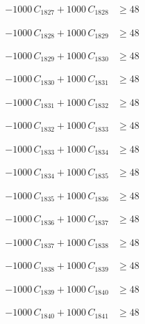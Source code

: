 \documentclass[a4paper,11pt]{article}
\begin{document}
\begin{align}
-1000\,C_{1827} + 1000\,C_{1828} &\geq 48 \nonumber
\end{align}

\begin{align}
-1000\,C_{1828} + 1000\,C_{1829} &\geq 48 \nonumber
\end{align}

\begin{align}
-1000\,C_{1829} + 1000\,C_{1830} &\geq 48 \nonumber
\end{align}

\begin{align}
-1000\,C_{1830} + 1000\,C_{1831} &\geq 48 \nonumber
\end{align}

\begin{align}
-1000\,C_{1831} + 1000\,C_{1832} &\geq 48 \nonumber
\end{align}

\begin{align}
-1000\,C_{1832} + 1000\,C_{1833} &\geq 48 \nonumber
\end{align}

\begin{align}
-1000\,C_{1833} + 1000\,C_{1834} &\geq 48 \nonumber
\end{align}

\begin{align}
-1000\,C_{1834} + 1000\,C_{1835} &\geq 48 \nonumber
\end{align}

\begin{align}
-1000\,C_{1835} + 1000\,C_{1836} &\geq 48 \nonumber
\end{align}

\begin{align}
-1000\,C_{1836} + 1000\,C_{1837} &\geq 48 \nonumber
\end{align}

\begin{align}
-1000\,C_{1837} + 1000\,C_{1838} &\geq 48 \nonumber
\end{align}

\begin{align}
-1000\,C_{1838} + 1000\,C_{1839} &\geq 48 \nonumber
\end{align}

\begin{align}
-1000\,C_{1839} + 1000\,C_{1840} &\geq 48 \nonumber
\end{align}

\begin{align}
-1000\,C_{1840} + 1000\,C_{1841} &\geq 48 \nonumber
\end{align}
\end{document}
